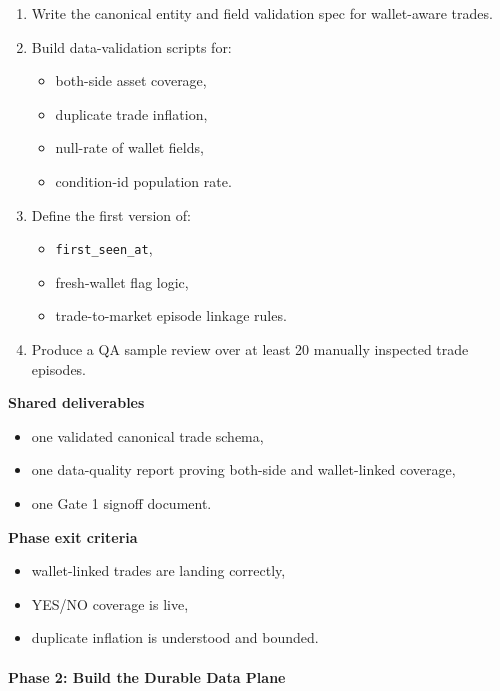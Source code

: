 \documentclass[
]{article}
\providecommand{\tightlist}{%
  \setlength{\itemsep}{0pt}\setlength{\parskip}{0pt}}
\begin{document}
\begin{enumerate}
\def\labelenumi{\arabic{enumi}.}
\tightlist
\item
  Write the canonical entity and field validation spec for wallet-aware
  trades.
\item
  Build data-validation scripts for:

  \begin{itemize}
  \tightlist
  \item
    both-side asset coverage,
  \item
    duplicate trade inflation,
  \item
    null-rate of wallet fields,
  \item
    condition-id population rate.
  \end{itemize}
\item
  Define the first version of:

  \begin{itemize}
  \tightlist
  \item
    \texttt{first\_seen\_at},
  \item
    fresh-wallet flag logic,
  \item
    trade-to-market episode linkage rules.
  \end{itemize}
\item
  Produce a QA sample review over at least 20 manually inspected trade
  episodes.
\end{enumerate}

\textbf{Shared deliverables}

\begin{itemize}
\tightlist
\item
  one validated canonical trade schema,
\item
  one data-quality report proving both-side and wallet-linked coverage,
\item
  one Gate 1 signoff document.
\end{itemize}

\textbf{Phase exit criteria}

\begin{itemize}
\tightlist
\item
  wallet-linked trades are landing correctly,
\item
  YES/NO coverage is live,
\item
  duplicate inflation is understood and bounded.
\end{itemize}

\paragraph{Phase 2: Build the Durable Data
Plane}\label{phase-2-build-the-durable-data-plane}
\end{document}

